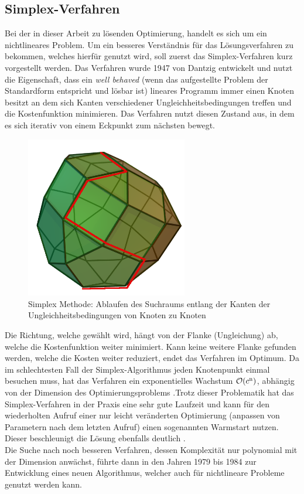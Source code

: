 \documentclass{like}
\begin{document}
\subsection{Simplex-Verfahren}
Bei der in dieser Arbeit zu lösenden Optimierung, handelt es sich um ein nichtlineares Problem. Um ein besseres Verständnis für das Lösungsverfahren zu bekommen, welches hierfür genutzt wird, soll zuerst das Simplex-Verfahren kurz vorgestellt werden. Das Verfahren wurde 1947 von Dantzig \cite{dantzig51} entwickelt und nutzt die Eigenschaft, dass ein \textit{well behaved} (wenn das aufgestellte Problem der Standardform entspricht und lösbar ist) lineares Programm immer einen Knoten besitzt an dem sich Kanten verschiedener Ungleichheitsbedingungen treffen und die Kostenfunktion minimieren. Das Verfahren nutzt diesen Zustand aus, in dem es sich iterativ von einem Eckpunkt zum nächsten bewegt. 
\begin{figure}[ht!]
	\centering
	\includegraphics[width=200pt]{Abbildungen/simplexMethod.png}
	\caption{Simplex Methode: Ablaufen des Suchraums entlang der Kanten der Ungleichheitsbedingungen von Knoten zu Knoten}
	\label{fig:splxMethod}
\end{figure}

Die Richtung, welche gewählt wird, hängt von der Flanke (Ungleichung) ab, welche die Kostenfunktion weiter minimiert. Kann keine weitere Flanke gefunden werden, welche die Kosten weiter reduziert, endet das Verfahren im Optimum. Da im schlechtesten Fall der Simplex-Algorithmus jeden Knotenpunkt einmal besuchen muss, hat das Verfahren ein exponentielles Wachstum $\mathcal{O}(c\textsuperscript{n})$, abhängig von der Dimension des Optimierungsproblems \cite{doi:10.1137/S0036144502414942}.Trotz dieser Problematik hat das Simplex-Verfahren in der Praxis eine sehr gute Laufzeit und kann für den wiederholten Aufruf einer nur leicht veränderten Optimierung (anpassen von Parametern nach dem letzten Aufruf) einen sogenannten Warmstart nutzen. Dieser beschleunigt die Lösung ebenfalls deutlich \cite{simplexWiki:1}.\\
Die Suche nach noch besseren Verfahren, dessen Komplexität nur polynomial mit der Dimension anwächst, führte dann in den Jahren 1979 bis 1984 zur Entwicklung eines neuen Algorithmus, welcher auch für nichtlineare Probleme genutzt werden kann.
\end{document}
